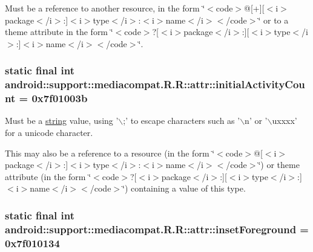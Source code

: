 Must be a reference to another resource, in the form \char`\"{}$<$code$>$@\mbox{[}+\mbox{]}\mbox{[}$<$i$>$package$<$/i$>$:\mbox{]}$<$i$>$type$<$/i$>$:$<$i$>$name$<$/i$>$$<$/code$>$\char`\"{} or to a theme attribute in the form \char`\"{}$<$code$>$?\mbox{[}$<$i$>$package$<$/i$>$:\mbox{]}\mbox{[}$<$i$>$type$<$/i$>$:\mbox{]}$<$i$>$name$<$/i$>$$<$/code$>$\char`\"{}. \hypertarget{classandroid_1_1support_1_1mediacompat_1_1_r_1_1attr_e7440a6a439994997e83d30cbc791459}{
\subsubsection[{initialActivityCount}]{\setlength{\rightskip}{0pt plus 5cm}static final int android::support::mediacompat.R.R::attr::initialActivityCount = 0x7f01003b}}
\label{classandroid_1_1support_1_1mediacompat_1_1_r_1_1attr_e7440a6a439994997e83d30cbc791459}


Must be a \hyperlink{classandroid_1_1support_1_1mediacompat_1_1_r_1_1string}{string} value, using '$\backslash$;' to escape characters such as '$\backslash$n' or '$\backslash$uxxxx' for a unicode character. 

This may also be a reference to a resource (in the form \char`\"{}$<$code$>$@\mbox{[}$<$i$>$package$<$/i$>$:\mbox{]}$<$i$>$type$<$/i$>$:$<$i$>$name$<$/i$>$$<$/code$>$\char`\"{}) or theme attribute (in the form \char`\"{}$<$code$>$?\mbox{[}$<$i$>$package$<$/i$>$:\mbox{]}\mbox{[}$<$i$>$type$<$/i$>$:\mbox{]}$<$i$>$name$<$/i$>$$<$/code$>$\char`\"{}) containing a value of this type. \hypertarget{classandroid_1_1support_1_1mediacompat_1_1_r_1_1attr_d903f082ccd1e9393395296495b0a2fd}{
\subsubsection[{insetForeground}]{\setlength{\rightskip}{0pt plus 5cm}static final int android::support::mediacompat.R.R::attr::insetForeground = 0x7f010134}}
\label{classandroid_1_1support_1_1mediacompat_1_1_r_1_1attr_d903f082ccd1e9393395296495b0a2fd}


